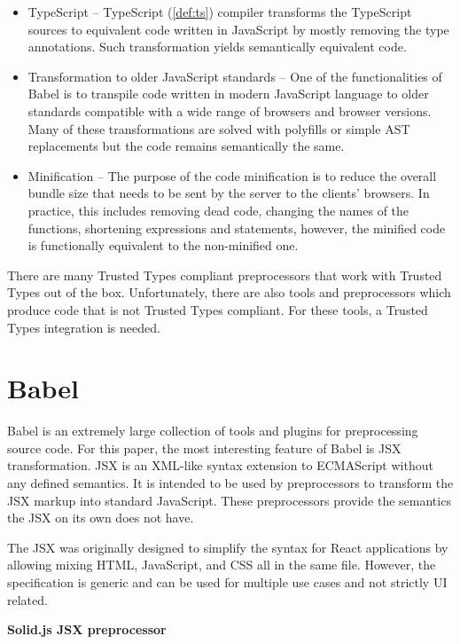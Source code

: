 \begin{itemize}
  \item TypeScript -- TypeScript (\ref{def:ts}) compiler transforms the TypeScript sources to
        equiva\-lent code written in JavaScript by mostly removing the type annotations. Such
        transformation yields semantically equivalent code.
  \item Transformation to older JavaScript standards -- One of the functionalities of Babel is to
        transpile code written in modern JavaScript language to older standards compatible with a
        wide range of browsers and browser versions. Many of these transformations are solved with
        polyfills or simple AST replacements but the code remains semantically the same.
  \item Minification -- The purpose of the code minification is to reduce the overall bundle size
        that needs to be sent by the server to the clients' browsers. In practice, this includes
        removing dead code, changing the names of the functions, shortening expressions and
        statements, however, the minified code is functionally equivalent to the non-minified one.
\end{itemize}

There are many Trusted Types compliant preprocessors that work with Trusted Types out of the box.
Unfortunately, there are also tools and preprocessors which produce code that is not Trusted Types
compliant. For these tools, a Trusted Types integration is needed.

\section{Babel}

Babel is an extremely large collection of tools and plugins for preprocessing source code. For this
paper, the most interesting feature of Babel is JSX transformation. JSX is an XML-like syntax
extension to ECMAScript without any defined semantics. It is intended to be used by preprocessors to
transform the JSX markup into standard JavaScript. These preprocessors provide the semantics the JSX
on its own does not have.

The JSX was originally designed to simplify the syntax for React applications by allowing mixing
HTML, JavaScript, and CSS all in the same file. However, the specification \cite{jsx_spec} is
generic and can be used for multiple use cases and not strictly UI related.

\medskip
\begin{flushleft}\textbf {Solid.js JSX preprocessor}\end{flushleft}
\medskip
\label{jsx_solid_preprocessor}

